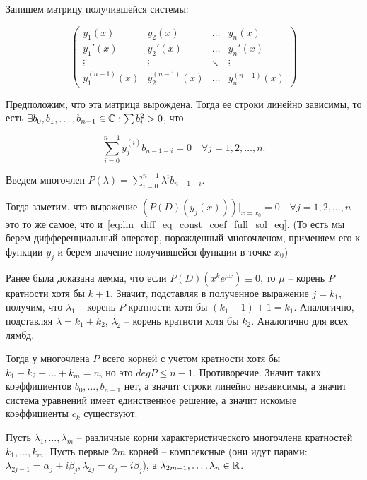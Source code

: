 Запишем матрицу получившейся системы:

\begin{equation*}
    \begin{pmatrix}
        y_1(x) & y_2(x) & \dots & y_n(x) \\
        y_1'(x) & y_2'(x) & \dots & y_n'(x) \\
        \vdots       & \vdots       & \ddots & \vdots       \\
        y_1^{(n-1)}(x) & y_2^{(n-1)}(x) & \dots & y_n^{(n-1)}(x)
    \end{pmatrix}
\end{equation*}

Предположим, что эта матрица вырождена. Тогда ее строки линейно зависимы, то есть $\exists b_0, b_1, \dots, b_{n-1} \in \mathbb{C}: \sum b_i^2 > 0$, что

\begin{equation}
    \sum_{i=0}^{n-1} y_j^{(i)} b_{n-1-i} = 0 \quad \forall j = 1, 2, \dots, n.
    \label{eq:lin_diff_eq_const_coef_full_sol_eq}
\end{equation}

Введем многочлен $P(\lambda) = \sum_{i=0}^{n-1} \lambda^i b_{n-1-i}$.

Тогда заметим, что выражение $(P(D)(y_j(x)))|_{x=x_0} = 0 \quad \forall j = 1, 2, \dots, n$ -- это то же самое, что и~\ref{eq:lin_diff_eq_const_coef_full_sol_eq}.
(То есть мы берем дифференциальный оператор, порожденный многочленом, применяем его к функции $y_j$ и берем значение получившейся функции в точке $x_0$)

Ранее была доказана лемма, что если $P(D)(x^k e^{\mu x}) \equiv 0$, то $\mu$ -- корень $P$ кратности хотя бы $k+1$.
Значит, подставляя в полученное выражение $j=k_1$, получим, что $\lambda_1$ -- корень $P$ кратности хотя бы $(k_1-1)+1=k_1$.
Аналогично, подставляя $\lambda = k_1 + k_2$, $\lambda_2$ -- корень кратноти хотя бы $k_2$.
Аналогично для всех лямбд.

Тогда у многочлена $P$ всего корней с учетом кратности хотя бы $k_1 + k_2 + \dots + k_m = n$, но это $deg P \leq n-1$.
Противоречие.
Значит таких коэффициентов $b_0, \dots, b_{n-1}$ нет, а значит строки линейно независимы, а значит система уравнений имеет единственное решение, а значит искомые коэффициенты $c_k$ существуют.

\Endproof

 Пусть $\lambda_1, \dots, \lambda_m$ -- различные корни характеристического многочлена кратностей $k_1, \dots, k_m$.
Пусть первые $2m$ корней -- комплексные (они идут парами: $\lambda_{2j-1}=\alpha_j + i\beta_j, \lambda_{2j}=\alpha_j-i\beta_j$), а $\lambda_{2m+1}, \dots, \lambda_n \in \mathbb{R}$.


